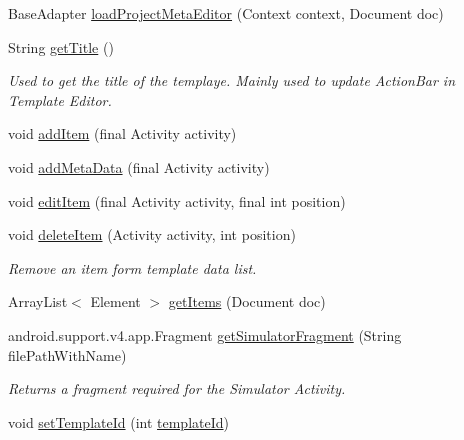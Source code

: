 \begin{DoxyCompactItemize}
\item 
Base\+Adapter \hyperlink{classorg_1_1buildmlearn_1_1toolkit_1_1templates_1_1ComprehensionTemplate_a41bb653218615269dad3ab715bfa71ab}{load\+Project\+Meta\+Editor} (Context context, Document doc)
\item 
String \hyperlink{classorg_1_1buildmlearn_1_1toolkit_1_1templates_1_1ComprehensionTemplate_a8e8c4eb76f8262dfb4b4b54f6ff3079c}{get\+Title} ()
\begin{DoxyCompactList}\small\item\em Used to get the title of the templaye. Mainly used to update Action\+Bar in Template Editor. \end{DoxyCompactList}\item 
void \hyperlink{classorg_1_1buildmlearn_1_1toolkit_1_1templates_1_1ComprehensionTemplate_a694115c002e9457327a7051c39ea1a68}{add\+Item} (final Activity activity)
\item 
void \hyperlink{classorg_1_1buildmlearn_1_1toolkit_1_1templates_1_1ComprehensionTemplate_ae6f7e149fddb64deedfdf8753eee60b1}{add\+Meta\+Data} (final Activity activity)
\item 
void \hyperlink{classorg_1_1buildmlearn_1_1toolkit_1_1templates_1_1ComprehensionTemplate_ac3474a96bc8de6b5fd44bf4cffdf8a98}{edit\+Item} (final Activity activity, final int position)
\item 
void \hyperlink{classorg_1_1buildmlearn_1_1toolkit_1_1templates_1_1ComprehensionTemplate_a894ff749119309ccf9b8c05781b069f8}{delete\+Item} (Activity activity, int position)
\begin{DoxyCompactList}\small\item\em Remove an item form template data list. \end{DoxyCompactList}\item 
Array\+List$<$ Element $>$ \hyperlink{classorg_1_1buildmlearn_1_1toolkit_1_1templates_1_1ComprehensionTemplate_acc76484d31d64a0ae2b83ea534062a6e}{get\+Items} (Document doc)
\item 
android.\+support.\+v4.\+app.\+Fragment \hyperlink{classorg_1_1buildmlearn_1_1toolkit_1_1templates_1_1ComprehensionTemplate_a167a4df05d5d3ea662997e5a37aeeab8}{get\+Simulator\+Fragment} (String file\+Path\+With\+Name)
\begin{DoxyCompactList}\small\item\em Returns a fragment required for the Simulator Activity. \end{DoxyCompactList}\item 
void \hyperlink{classorg_1_1buildmlearn_1_1toolkit_1_1templates_1_1ComprehensionTemplate_ab4c781e71b5cf6bc8a634571bda8b2d8}{set\+Template\+Id} (int \hyperlink{classorg_1_1buildmlearn_1_1toolkit_1_1templates_1_1ComprehensionTemplate_ae08ea9d3e4cade37472f3521c239c1f7}{template\+Id})

\end{DoxyCompactItemize}
